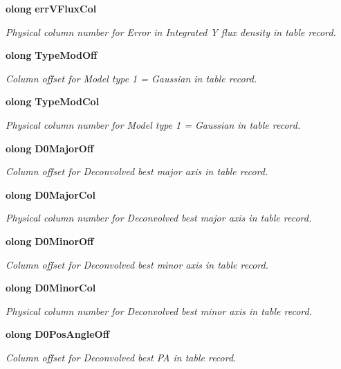 \begin{CompactItemize}
{\bf olong} {\bf err\-VFlux\-Col}
\begin{CompactList}\small\item\em Physical column number for Error in Integrated Y flux density in table record. \item\end{CompactList}\item 
{\bf olong} {\bf Type\-Mod\-Off}
\begin{CompactList}\small\item\em Column offset for Model type 1 = Gaussian in table record. \item\end{CompactList}\item 
{\bf olong} {\bf Type\-Mod\-Col}
\begin{CompactList}\small\item\em Physical column number for Model type 1 = Gaussian in table record. \item\end{CompactList}\item 
{\bf olong} {\bf D0Major\-Off}
\begin{CompactList}\small\item\em Column offset for Deconvolved best major axis in table record. \item\end{CompactList}\item 
{\bf olong} {\bf D0Major\-Col}
\begin{CompactList}\small\item\em Physical column number for Deconvolved best major axis in table record. \item\end{CompactList}\item 
{\bf olong} {\bf D0Minor\-Off}
\begin{CompactList}\small\item\em Column offset for Deconvolved best minor axis in table record. \item\end{CompactList}\item 
{\bf olong} {\bf D0Minor\-Col}
\begin{CompactList}\small\item\em Physical column number for Deconvolved best minor axis in table record. \item\end{CompactList}\item 
{\bf olong} {\bf D0Pos\-Angle\-Off}
\begin{CompactList}\small\item\em Column offset for Deconvolved best PA in table record. \item\end{CompactList}\item 

\end{CompactItemize}
